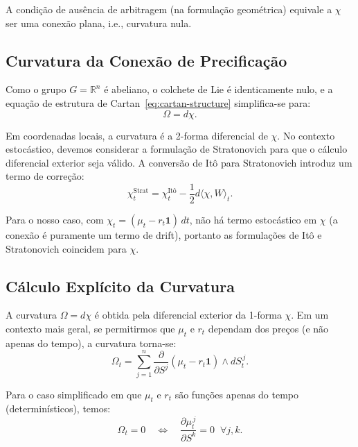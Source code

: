 A condi\c{c}\~ao de aus\^encia de arbitragem (na formula\c{c}\~ao geom\'etrica) equivale a \(\chi\) ser uma conex\~ao plana, i.e., curvatura nula.

\subsection{Curvatura da Conex\~ao de Precifica\c{c}\~ao}

Como o grupo \(G = \mathbb{R}^n\) \'e abeliano, o colchete de Lie \'e identicamente nulo, e a equa\c{c}\~ao de estrutura de Cartan~\eqref{eq:cartan-structure} simplifica-se para:
\begin{equation}\label{eq:curvature-abelian}
 \Omega = d\chi.
\end{equation}

Em coordenadas locais, a curvatura \'e a 2-forma diferencial de \(\chi\). No contexto estoc\'astico, devemos considerar a formula\c{c}\~ao de Stratonovich para que o c\'alculo diferencial exterior seja v\'alido. A convers\~ao de It\^o para Stratonovich introduz um termo de corre\c{c}\~ao:
\begin{equation}\label{eq:ito-strat}
 \chi_t^{\text{Strat}} = \chi_t^{\text{It\^o}} - \frac{1}{2} d\langle \chi, W \rangle_t.
\end{equation}

Para o nosso caso, com \(\chi_t = (\mu_t - r_t \mathbf{1})\,dt\), n\~ao h\'a termo estoc\'astico em \(\chi\) (a conex\~ao \'e puramente um termo de drift), portanto as formula\c{c}\~oes de It\^o e Stratonovich coincidem para \(\chi\).

\subsection{C\'alculo Expl\'icito da Curvatura}

A curvatura \(\Omega = d\chi\) \'e obtida pela diferencial exterior da 1-forma \(\chi\). Em um contexto mais geral, se permitirmos que \(\mu_t\) e \(r_t\) dependam dos pre\c{c}os (e n\~ao apenas do tempo), a curvatura torna-se:
\begin{equation}\label{eq:curvature-market}
 \Omega_t = \sum_{j=1}^{n} \frac{\partial}{\partial S^j} (\mu_t - r_t \mathbf{1}) \wedge dS_t^{\,j}.
\end{equation}

Para o caso simplificado em que \(\mu_t\) e \(r_t\) s\~ao fun\c{c}\~oes apenas do tempo (determin\'isticos), temos:
\begin{equation}\label{eq:curvature-deterministic}
 \Omega_t = 0 \quad \Longleftrightarrow \quad \frac{\partial \mu_t^{\,j}}{\partial S^k} = 0 \;\; \forall j,k.
\end{equation}

